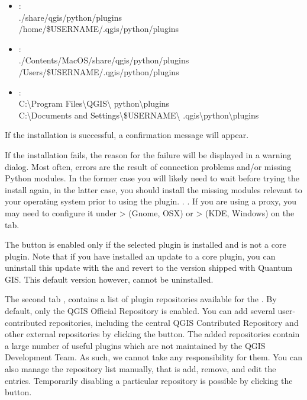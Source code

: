 \begin{itemize}
\item {}:\\
./share/qgis/python/plugins \\
/home/\$USERNAME/.qgis/python/plugins
\item {}:\\
./Contents/MacOS/share/qgis/python/plugins \\
/Users/\$USERNAME/.qgis/python/plugins
\item {}:\\
C:\textbackslash Program Files\textbackslash QGIS\textbackslash
python\textbackslash plugins \\
C:\textbackslash Documents and Settings\textbackslash\$USERNAME\textbackslash
.qgis\textbackslash python\textbackslash plugins
\end{itemize}

If the installation is successful, a confirmation message will appear.

If the installation fails, the reason for the failure will be displayed 
in a warning dialog. Most often, errors are the result of connection problems 
and/or missing Python modules. In the former case you will likely need to 
wait before trying the install again, in the latter case, you should install 
the missing modules relevant to your operating system prior to using the 
plugin. . . If you are using a proxy, you may need to configure it under 
 >  (Gnome, OSX) 
or  >  (KDE, Windows) 
on the  tab.

The  button is enabled only if the selected plugin is installed and is not a core plugin. Note that if you have installed an update to a core plugin, you can uninstall this update with the  and revert to the version shipped with Quantum GIS. This default version however, cannot be uninstalled.


The second tab , contains a list of plugin repositories available for the . By default, only the QGIS Official Repository is enabled. You can add several user-contributed repositories, including the central QGIS Contributed Repository and other external repositories by clicking the  button. The added repositories contain a large number of useful plugins which are not maintained by the QGIS Development Team. As such, we cannot take any responsibility for them. You can also manage the repository list manually, that is add, remove, and edit the entries. Temporarily disabling a particular repository is possible by clicking the  button.

